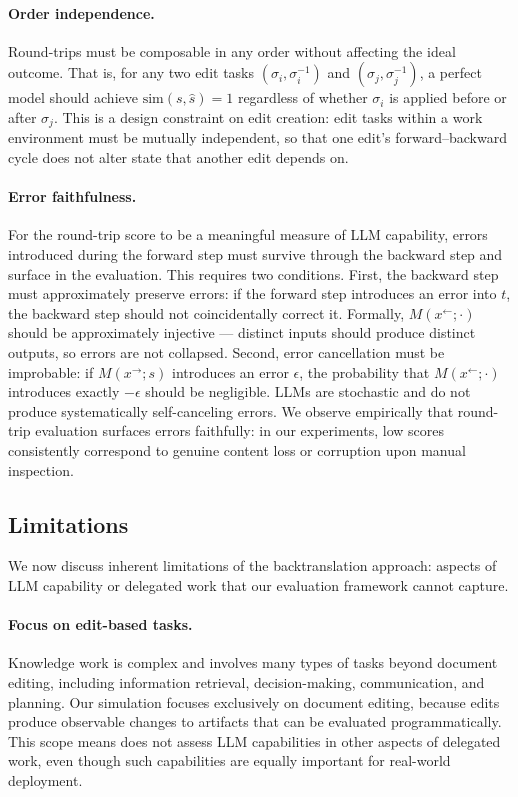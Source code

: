 \documentclass{article} %
\begin{document}
\paragraph{Order independence.} Round-trips must be composable in any order without affecting the ideal outcome. That is, for any two edit tasks $(\sigma_i, \sigma_i^{-1})$ and $(\sigma_j, \sigma_j^{-1})$, a perfect model should achieve $\mathrm{sim}(s, \hat{s}) = 1$ regardless of whether $\sigma_i$ is applied before or after $\sigma_j$. This is a design constraint on edit creation: edit tasks within a work environment must be mutually independent, so that one edit's forward--backward cycle does not alter state that another edit depends on.

\paragraph{Error faithfulness.} For the round-trip score to be a meaningful measure of LLM capability, errors introduced during the forward step must survive through the backward step and surface in the evaluation. This requires two conditions. First, the backward step must approximately preserve errors: if the forward step introduces an error into $t$, the backward step should not coincidentally correct it. Formally, $M(x^{\leftarrow}; \cdot)$ should be approximately injective --- distinct inputs should produce distinct outputs, so errors are not collapsed. Second, error cancellation must be improbable: if $M(x^{\rightarrow}; s)$ introduces an error $\epsilon$, the probability that $M(x^{\leftarrow}; \cdot)$ introduces exactly $-\epsilon$ should be negligible. LLMs are stochastic and do not produce systematically self-canceling errors. We observe empirically that round-trip evaluation surfaces errors faithfully: in our experiments, low scores consistently correspond to genuine content loss or corruption upon manual inspection.

\subsection{Limitations} \label{app:bt_limitations}

We now discuss inherent limitations of the backtranslation approach: aspects of LLM capability or delegated work that our evaluation framework cannot capture.

\paragraph{Focus on edit-based tasks.} Knowledge work is complex and involves many types of tasks beyond document editing, including information retrieval, decision-making, communication, and planning. Our simulation focuses exclusively on document editing, because edits produce observable changes to artifacts that can be evaluated programmatically. This scope means \benchmark{} does not assess LLM capabilities in other aspects of delegated work, even though such capabilities are equally important for real-world deployment.
\end{document}
